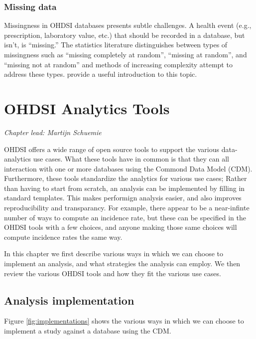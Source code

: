 \documentclass[11pt]{book}
\begin{document}
\subsection{Missing data}\label{missing-data}

Missingness in OHDSI databases presents subtle challenges. A health
event (e.g., prescription, laboratory value, etc.) that should be
recorded in a database, but isn't, is ``missing.'' The statistics
literature distinguishes between types of missingness such as ``missing
completely at random'', ``missing at random'', and ``missing not at
random'' and methods of increasing complexity attempt to address these
types. \citet{perkins2017principled} provide a useful introduction to
this topic.

\chapter{OHDSI Analytics Tools}\label{OhdsiAnalyticsTools}

\emph{Chapter lead: Martijn Schuemie}

OHDSI offers a wide range of open source tools to support the various
data-analytics use cases. What these tools have in common is that they
can all interaction with one or more databases using the Commond Data
Model (CDM). Furthermore, these tools standardize the analytics for
various use cases; Rather than having to start from scratch, an analysis
can be implemented by filling in standard templates. This makes
performign analysis easier, and also improves reproducibility and
transparancy. For example, there appear to be a near-infinte number of
ways to compute an incidence rate, but these can be specified in the
OHDSI tools with a few choices, and anyone making those same choices
will compute incidence rates the same way.

In this chapter we first describe various ways in which we can choose to
implement an analysis, and what strategies the analysis can employ. We
then review the various OHDSI tools and how they fit the various use
cases.

\section{Analysis implementation}\label{analysis-implementation}

Figure \ref{fig:implementations} shows the various ways in which we can
choose to implement a study against a database using the CDM.
\end{document}
